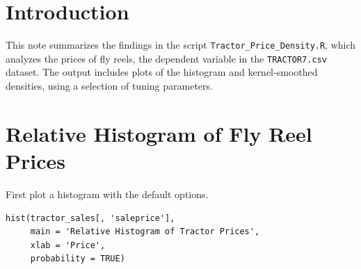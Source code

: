 %
%
%
%
%



\section{Introduction}

This note summarizes the findings in the script
\texttt{Tractor\_Price\_Density.R},
which analyzes the prices of fly reels,
the dependent variable in the \texttt{TRACTOR7.csv} dataset.
The output includes plots of the histogram
and kernel-smoothed densities,
using a selection of tuning parameters.

\vfill
\pagebreak
\section{Relative Histogram of Fly Reel Prices}


First plot a histogram with the default options.

\begin{verbatim}
hist(tractor_sales[, 'saleprice'],
     main = 'Relative Histogram of Tractor Prices',
     xlab = 'Price',
     probability = TRUE)
\end{verbatim}



